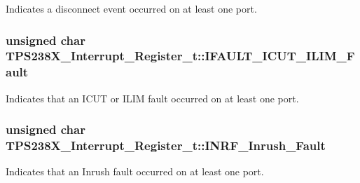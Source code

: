 Indicates a disconnect event occurred on at least one port. 

\hypertarget{struct_t_p_s238_x___interrupt___register__t_a98089a33f7d51df0d5ddfc66a14db4a9}{
\subsubsection[{I\-F\-A\-U\-L\-T\-\_\-\-I\-C\-U\-T\-\_\-\-I\-L\-I\-M\-\_\-\-Fault}]{\setlength{\rightskip}{0pt plus 5cm}unsigned char T\-P\-S238\-X\-\_\-\-Interrupt\-\_\-\-Register\-\_\-t\-::\-I\-F\-A\-U\-L\-T\-\_\-\-I\-C\-U\-T\-\_\-\-I\-L\-I\-M\-\_\-\-Fault}}\label{struct_t_p_s238_x___interrupt___register__t_a98089a33f7d51df0d5ddfc66a14db4a9}


Indicates that an I\-C\-U\-T or I\-L\-I\-M fault occurred on at least one port. 

\hypertarget{struct_t_p_s238_x___interrupt___register__t_a59a57f6f8ac9084ac4a1787791bab499}{
\subsubsection[{I\-N\-R\-F\-\_\-\-Inrush\-\_\-\-Fault}]{\setlength{\rightskip}{0pt plus 5cm}unsigned char T\-P\-S238\-X\-\_\-\-Interrupt\-\_\-\-Register\-\_\-t\-::\-I\-N\-R\-F\-\_\-\-Inrush\-\_\-\-Fault}}\label{struct_t_p_s238_x___interrupt___register__t_a59a57f6f8ac9084ac4a1787791bab499}


Indicates that an Inrush fault occurred on at least one port. 

